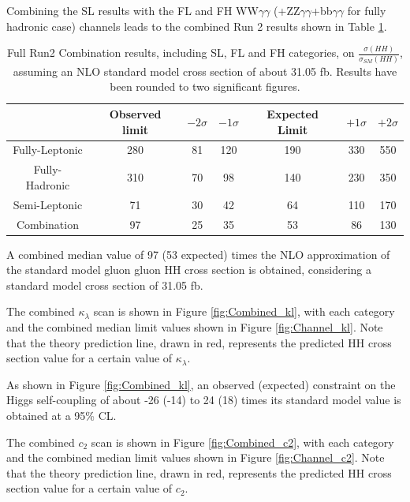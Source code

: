 Combining the SL results with the FL and FH WW$\gamma\gamma$ (+ZZ$\gamma\gamma$+bb$\gamma \gamma$ for fully hadronic case) channels leads to the combined
Run 2 results shown in Table \ref{tab:Run2Results}.

\begin{table}[h!]
  \begin{center}
    \begin{tabular}{c|c|ccccc}
      \hline
        & Observed limit & $-2\sigma$ & $-1\sigma$ & Expected Limit & $+1\sigma$ & $+2\sigma$ \\ \hline
          Fully-Leptonic &  280   &   81 & 120 & 190 & 330 & 550  \\ \hline
          Fully-Hadronic &  310  &   70 & 98 & 140 & 230 & 350   \\ \hline
          Semi-Leptonic  &  71  &   30 & 42 & 64 & 110 & 170 \\ \hline
          Combination    &  97  &   25 & 35 & 53 & 86 & 130  \\ \hline
          \end{tabular}
  \end{center}
  \caption{Full Run2 Combination results, including SL, FL and FH categories,
  on $\frac{\sigma(HH)}{\sigma_{SM}(HH)}$, assuming an NLO standard model cross section of about 31.05 fb. Results have been rounded to two significant figures.}
  \label{tab:Run2Results}
\end{table}  

A combined median value of 97 (53 expected) times the NLO approximation of the standard model gluon gluon HH cross section is obtained, considering a standard model cross section of 31.05 fb. 

The combined $\kappa_{\lambda}$ scan is shown in Figure \ref{fig:Combined_kl}, with each category and the combined median limit values shown
in Figure \ref{fig:Channel_kl}. Note that the theory prediction line, drawn in red, represents the predicted HH cross section value for a certain value of $\kappa_{\lambda}$.

As shown in Figure \ref{fig:Combined_kl}, an observed (expected) constraint on the Higgs self-coupling of about -26 (-14) to 24 (18) times its standard model value 
is obtained at a 95\% CL. 

The combined $c_{2}$ scan is shown in Figure \ref{fig:Combined_c2}, with each category and the combined median limit values shown
in Figure \ref{fig:Channel_c2}. Note that the theory prediction line, drawn in red, represents the predicted HH cross section value for a certain value of $c_{2}$.

